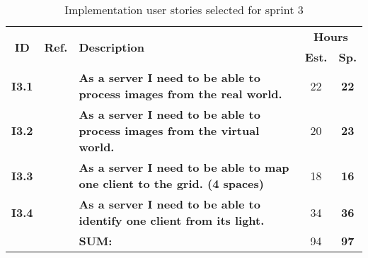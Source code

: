  \def\arraystretch{1.25}
 
\begin{longtable}{ccXcc}
  \label{tab:sprint3stories}\\[-6mm]
\caption{Implementation user stories selected for sprint 3}\\[-4mm]

\toprule[0.5mm]
\multirow{2}{*}{\textbf{ID}} &
\multirow{2}{*}{\textbf{Ref.}} & \multirow{2}{*}{\textbf{Description}} & \multicolumn{2}{c}{\textbf{Hours}} \\
 					& & & \textbf{Est.} & \textbf{Sp.} \\
\midrule
\textbf{I3.1} 	& 	& {\bf As a server I need to be able to process images from the real world.}		& 22		& \textbf{22} \\

\textbf{I3.2} 	& 	& {\bf As a server I need to be able to process images from the virtual world.}		& 20		& \textbf{23} \\

\textbf{I3.3} 	& 	& {\bf As a server I need to be able to map one client to the grid. (4 spaces)} 	& 18		& \textbf{16} \\	

\textbf{I3.4} 	& 	& {\bf As a server I need to be able to identify one client from its light.} 		& 34		& \textbf{36} \\
	
\midrule
		
				&& \textbf{SUM:}		&		94	& \textbf{97}
 \\																			
\bottomrule[0.5mm]
\end{longtable}
